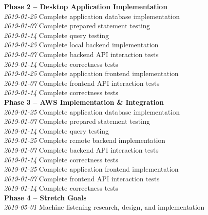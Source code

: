 \textbf{Phase 2 -- Desktop Application Implementation}\\
\textit{2019-01-25}	Complete application database implementation\\
\tab \textit{2019-01-07}	Complete prepared statement testing\\
\tab \textit{2019-01-14}	Complete query testing\\
\textit{2019-01-25}	Complete local backend implementation\\
\tab \textit{2019-01-07}	Complete backend API interaction tests\\
\tab \textit{2019-01-14}	Complete correctness tests\\
\textit{2019-01-25}	Complete application frontend implementation\\
\tab \textit{2019-01-07}	Complete frontend API interaction tests\\
\tab \textit{2019-01-14}	Complete correctness tests\\

\textbf{Phase 3 -- AWS Implementation \& Integration}\\
\textit{2019-01-25}	Complete application database implementation\\
\tab \textit{2019-01-07}	Complete prepared statement testing\\
\tab \textit{2019-01-14}	Complete query testing\\
\textit{2019-01-25}	Complete remote backend implementation\\
\tab \textit{2019-01-07}	Complete backend API interaction tests\\
\tab \textit{2019-01-14}	Complete correctness tests\\
\textit{2019-01-25}	Complete application frontend implementation\\
\tab \textit{2019-01-07}	Complete frontend API interaction tests\\
\tab \textit{2019-01-14}	Complete correctness tests\\

\textbf{Phase 4 -- Stretch Goals}\\
\textit{2019-05-01}	Machine listening research, design, and implementation
